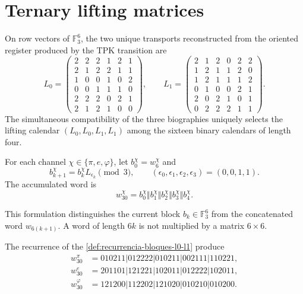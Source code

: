 \section{Ternary lifting matrices}

On row vectors of \(\mathbb F_3^6\), the two unique transports
reconstructed from the oriented register produced by the TPK transition
are
\[
L_0=
\begin{pmatrix}
2&2&2&1&2&1\\
2&1&2&2&1&1\\
1&0&0&1&0&2\\
0&0&1&1&1&0\\
2&2&2&0&2&1\\
2&1&2&1&0&0
\end{pmatrix},
\qquad
L_1=
\begin{pmatrix}
2&1&2&0&2&2\\
1&2&1&1&2&0\\
1&2&1&1&1&2\\
0&1&0&0&2&1\\
2&0&2&1&0&1\\
0&2&2&2&1&1
\end{pmatrix}.
\]
The simultaneous compatibility of the three biographies uniquely selects
the lifting calendar \((L_0,L_0,L_1,L_1)\) among the sixteen
binary calendars of length four.

\begin{definition}
\label{def:recurrencia-bloques-l0-l1}
For each channel \(\chi\in\{\pi,e,\varphi\}\), let
\(b_0^\chi=w_6^\chi\) and
\[
 b_{k+1}^\chi=b_k^\chi L_{\epsilon_k}\pmod3,
 \qquad
 (\epsilon_0,\epsilon_1,\epsilon_2,\epsilon_3)=(0,0,1,1).
\]
The accumulated word is
\[
 w_{30}^\chi
 =b_0^\chi\Vert b_1^\chi\Vert b_2^\chi
  \Vert b_3^\chi\Vert b_4^\chi.
\]
\end{definition}

This formulation distinguishes the current block \(b_k\in\mathbb F_3^6\) from
the concatenated word \(w_{6(k+1)}\). A word of length \(6k\) is not
multiplied by a matrix \(6\times6\).

\begin{theorem}
\label{thm:palabras-w30}
The recurrence of the \cref{def:recurrencia-bloques-l0-l1} produce
\begin{align*}
w_{30}^{\pi}
 &=010211|012222|010211|002111|110221,\\
w_{30}^{e}
 &=201101|121221|102011|012222|102011,\\
w_{30}^{\varphi}
 &=121200|112202|121020|010210|010200.
\end{align*}
\end{theorem}

